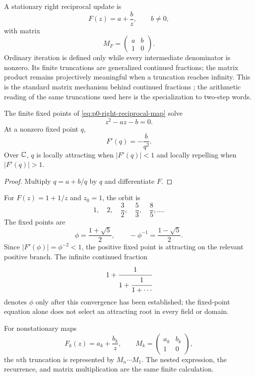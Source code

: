 A stationary right reciprocal update is
\begin{equation}\label{eq:p0-right-reciprocal-map}
  F(z)=a+\frac{b}{z},
  \qquad b\ne0,
\end{equation}
with matrix
\[
  M_F=\begin{pmatrix}a&b\\1&0\end{pmatrix}.
\]
Ordinary iteration is defined only while every intermediate denominator is
nonzero.  Its finite truncations are generalized continued fractions; the
matrix product remains projectively meaningful when a truncation reaches
infinity.  This is the standard matrix mechanism behind continued fractions
\cite{Khinchin1964ContinuedFractions}; the arithmetic reading of the same
truncations used here is the specialization to two-step words.

\begin{proposition}
\label{prop:p0-reciprocal-fixed-points}
The finite fixed points of \eqref{eq:p0-right-reciprocal-map} solve
\begin{equation}\label{eq:p0-reciprocal-quadratic}
  z^2-az-b=0.
\end{equation}
At a nonzero fixed point $q$,
\[
  F'(q)=-\frac{b}{q^2}.
\]
Over $\mathbb{C}$, $q$ is locally attracting when $|F'(q)|<1$ and locally repelling
when $|F'(q)|>1$.
\end{proposition}

\begin{proof}
Multiply $q=a+b/q$ by $q$ and differentiate $F$.
\end{proof}

\begin{example}
\label{ex:p0-golden-ratio}
For $F(z)=1+1/z$ and $z_0=1$, the orbit is
\[
  1,\quad2,\quad\frac32,\quad\frac53,\quad\frac85,\ldots.
\]
The fixed points are
\[
  \phi=\frac{1+\sqrt5}{2},
  \qquad
  -\phi^{-1}=\frac{1-\sqrt5}{2}.
\]
Since $|F'(\phi)|=\phi^{-2}<1$, the positive fixed point is attracting on the
relevant positive branch.  The infinite continued fraction
\[
  1+\cfrac1{1+\cfrac1{1+\cdots}}
\]
denotes $\phi$ only after this convergence has been established; the
fixed-point equation alone does not select an attracting root in every field
or domain.
\end{example}

For nonstationary maps
\[
  F_k(z)=a_k+\frac{b_k}{z},
  \qquad
  M_k=\begin{pmatrix}a_k&b_k\\1&0\end{pmatrix},
\]
the $n$th truncation is represented by $M_n\cdots M_1$.  The nested expression,
the recurrence, and matrix multiplication are the same finite calculation.

